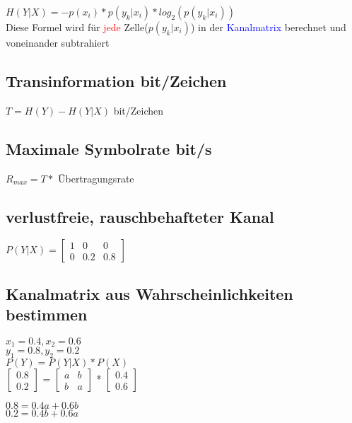 \colorbox{lightlightgrey}{$H(Y|X) = -p(x_i)*p(y_k|x_i) * log_2(p(y_k|x_i))$}\\
Diese Formel wird für \textcolor{red}{jede} Zelle($p(y_k|x_i)$) in der \textcolor{blue}{Kanalmatrix} berechnet und voneinander subtrahiert
\subsection{Transinformation bit/Zeichen}
\colorbox{lightlightgrey}{$T = H(Y) - H(Y|X)$ bit/Zeichen}



\subsection{Maximale Symbolrate bit/s}
$R_{max} = T *$ Übertragungsrate
\subsection{verlustfreie, rauschbehafteter Kanal}
$P(Y|X) = \begin{bmatrix}
              1 & 0 & 0\\
              0 & 0.2 & 0.8
\end{bmatrix}$



\subsection{Kanalmatrix aus Wahrscheinlichkeiten bestimmen}
\begin{minipage}[t]{0.15\textwidth}
    $x_1 = 0.4, x_2 = 0.6$\\
    $y_1 = 0.8, y_2 = 0.2$\\
    \colorbox{lightlightgrey}{$P(Y) = P(Y|X) * P(X)$}\\
    \colorbox{lightlightgrey}{$\begin{bmatrix}
                                   0.8\\
                                   0.2
    \end{bmatrix}$ =
    $\begin{bmatrix}
         a & b\\
         b & a
    \end{bmatrix}$ *
    $\begin{bmatrix}
         0.4\\
         0.6
    \end{bmatrix}$}
\end{minipage}
\hfill
\begin{minipage}[t]{0.15\textwidth}
    $0.8 = 0.4a + 0.6b$\\
    $0.2 = 0.4b + 0.6a$\\
\end{minipage}









